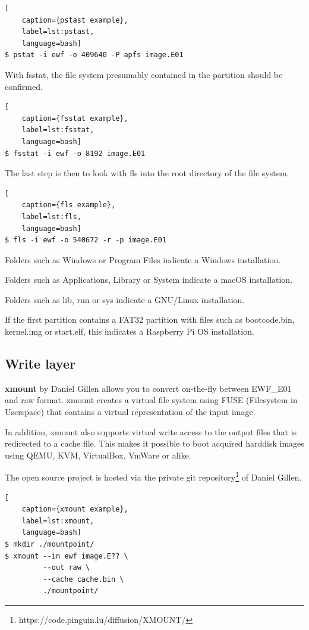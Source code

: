 \begin{lstlisting}[
    caption={pstast example},
    label=lst:pstast,
    language=bash]
$ pstat -i ewf -o 409640 -P apfs image.E01
\end{lstlisting}

With fsstat, the file system presumably contained in the partition should be confirmed.

\begin{lstlisting}[
    caption={fsstat example},
    label=lst:fsstat,
    language=bash]
$ fsstat -i ewf -o 8192 image.E01
\end{lstlisting}

The last step is then to look with fls into the root directory of the file system.

\begin{lstlisting}[
    caption={fls example},
    label=lst:fls,
    language=bash]
$ fls -i ewf -o 540672 -r -p image.E01
\end{lstlisting}

Folders such as Windows or \glqq{}Program Files\grqq{} indicate a Windows installation.

Folders such as Applications, Library or System indicate a macOS installation.

Folders such as lib, run or sys indicate a GNU/Linux installation.

If the first partition contains a FAT32 partition with files such as bootcode.bin, kernel.img or start.elf, this indicates a Raspberry Pi OS installation.

\subsection{Write layer}

\textbf{xmount} by Daniel Gillen allows you to convert on-the-fly between EWF\_E01 and raw format. xmount creates a virtual file system using FUSE (Filesystem in Userspace) that contains a virtual representation of the input image.

In addition, xmount also supports virtual write access to the output files that is redirected to a cache file. This makes it possible to boot acquired harddisk images using QEMU, KVM, VirtualBox, VmWare or alike.
 
The open source project is hosted via the private git repository\footnote{https://code.pinguin.lu/diffusion/XMOUNT/} of Daniel Gillen.

\begin{lstlisting}[
    caption={xmount example},
    label=lst:xmount,
    language=bash]
$ mkdir ./mountpoint/
$ xmount --in ewf image.E?? \
         --out raw \
         --cache cache.bin \
         ./mountpoint/
\end{lstlisting}

